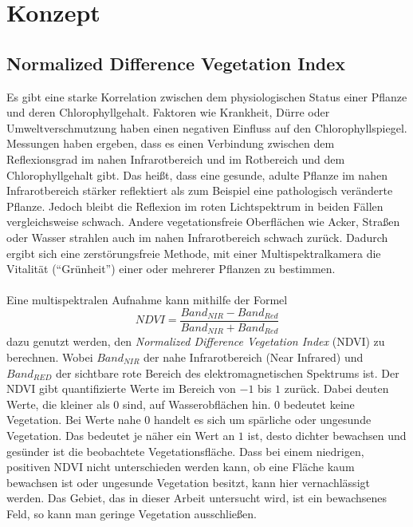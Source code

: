 \chapter{Konzept}\label{chap:concept}

\section{Normalized Difference Vegetation Index}\label{sec:ndvi}

Es gibt eine starke Korrelation zwischen dem physiologischen Status einer Pflanze und deren Chlorophyllgehalt. Faktoren wie Krankheit, Dürre oder Umweltverschmutzung haben einen negativen Einfluss auf den Chlorophyllspiegel.\cite{ref:hendry} Messungen haben ergeben, dass es einen Verbindung zwischen dem Reflexionsgrad im nahen Infrarotbereich und im Rotbereich und dem Chlorophyllgehalt gibt. Das heißt, dass eine gesunde, adulte Pflanze im nahen Infrarotbereich stärker reflektiert als zum Beispiel eine pathologisch veränderte Pflanze. Jedoch bleibt die Reflexion im roten Lichtspektrum in beiden Fällen vergleichsweise schwach. Andere vegetationsfreie Oberflächen wie Acker, Straßen oder Wasser strahlen auch im nahen Infrarotbereich schwach zurück. Dadurch ergibt sich eine zerstörungsfreie Methode, mit einer Multispektralkamera die Vitalität ("`Grünheit"') einer oder mehrerer Pflanzen zu bestimmen.\cite{ref:anatoly} \\\\
Eine multispektralen Aufnahme kann mithilfe der Formel 
\begin{equation}\label{equation:ndvi}
	NDVI = \frac{Band_{NIR} - Band_{Red}} {Band_{NIR} + Band_{Red}}
\end{equation}
dazu genutzt werden, den \textit{Normalized Difference Vegetation Index} (NDVI) zu berechnen. Wobei $Band_{NIR}$ der nahe Infrarotbereich (Near Infrared) und $Band_{RED}$ der sichtbare rote Bereich des elektromagnetischen Spektrums ist. Der NDVI gibt quantifizierte Werte im Bereich von $-1$ bis $1$ zurück. Dabei deuten Werte, die kleiner als $0$ sind, auf Wasserobflächen hin. $0$ bedeutet keine Vegetation. Bei Werte nahe $0$ handelt es sich um spärliche oder ungesunde Vegetation. Das bedeutet je näher ein Wert an $1$ ist, desto dichter bewachsen und gesünder ist die beobachtete Vegetationsfläche.\cite{ref:nasa} Dass bei einem niedrigen, positiven NDVI nicht unterschieden werden kann, ob eine Fläche kaum bewachsen ist oder ungesunde Vegetation besitzt, kann hier vernachlässigt werden. Das Gebiet, das in dieser Arbeit untersucht wird, ist ein bewachsenes Feld, so kann man geringe Vegetation ausschließen. 

